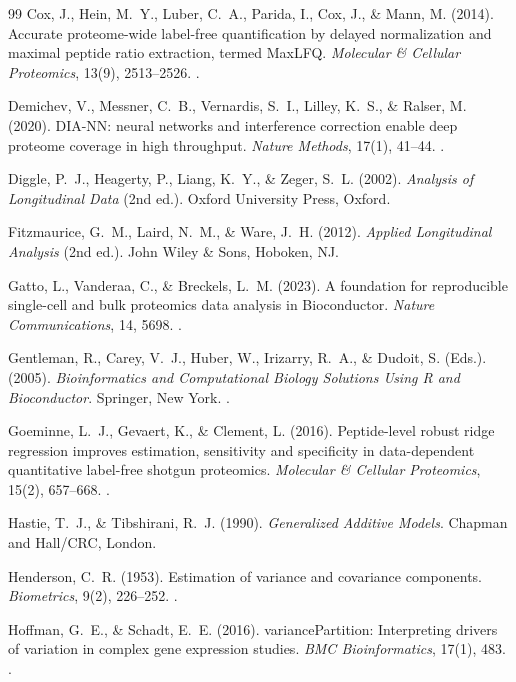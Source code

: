 \documentclass[11pt,twoside,openright]{book}
\begin{document}
\begin{thebibliography}{99}
Cox, J., Hein, M.~Y., Luber, C.~A., Parida, I., Cox, J., \& Mann, M. (2014). Accurate proteome-wide label-free quantification by delayed normalization and maximal peptide ratio extraction, termed MaxLFQ. \textit{Molecular \& Cellular Proteomics}, 13(9), 2513--2526. .

Demichev, V., Messner, C.~B., Vernardis, S.~I., Lilley, K.~S., \& Ralser, M. (2020). DIA-NN: neural networks and interference correction enable deep proteome coverage in high throughput. \textit{Nature Methods}, 17(1), 41--44. .

Diggle, P.~J., Heagerty, P., Liang, K.~Y., \& Zeger, S.~L. (2002). \textit{Analysis of Longitudinal Data} (2nd ed.). Oxford University Press, Oxford.

Fitzmaurice, G.~M., Laird, N.~M., \& Ware, J.~H. (2012). \textit{Applied Longitudinal Analysis} (2nd ed.). John Wiley \& Sons, Hoboken, NJ.

Gatto, L., Vanderaa, C., \& Breckels, L.~M. (2023). A foundation for reproducible single-cell and bulk proteomics data analysis in Bioconductor. \textit{Nature Communications}, 14, 5698. .

Gentleman, R., Carey, V.~J., Huber, W., Irizarry, R.~A., \& Dudoit, S. (Eds.). (2005). \textit{Bioinformatics and Computational Biology Solutions Using R and Bioconductor}. Springer, New York. .

Goeminne, L.~J., Gevaert, K., \& Clement, L. (2016). Peptide-level robust ridge regression improves estimation, sensitivity and specificity in data-dependent quantitative label-free shotgun proteomics. \textit{Molecular \& Cellular Proteomics}, 15(2), 657--668. .

Hastie, T.~J., \& Tibshirani, R.~J. (1990). \textit{Generalized Additive Models}. Chapman and Hall/CRC, London.

Henderson, C.~R. (1953). Estimation of variance and covariance components. \textit{Biometrics}, 9(2), 226--252. .

Hoffman, G.~E., \& Schadt, E.~E. (2016). variancePartition: Interpreting drivers of variation in complex gene expression studies. \textit{BMC Bioinformatics}, 17(1), 483. .


\end{thebibliography}
\end{document}
